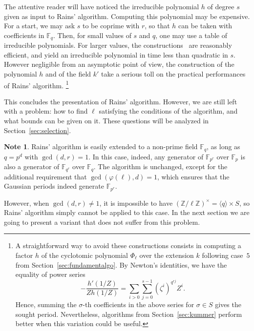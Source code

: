 \documentclass[12pt]{article}
\theoremstyle{plain}
\theoremstyle{definition}
\newtheorem{note}[theorem]{Note}
\def\Z{\ensuremath{\mathbb{Z}}}
\def\F{\ensuremath{\mathbb{F}}}
\def\euler{\ensuremath{\varphi}}
\newcounter{algorithm}
\begin{document}
The attentive reader will have noticed the irreducible polynomial $h$
of degree $s$ given as input to Rains' algorithm. Computing this
polynomial may be expensive. For a start, we may ask $s$ to be coprime
with $r$, so that $h$ can be taken with coefficients in $\F_q$. Then,
for small values of $s$ and $q$, one may use a table of irreducible
polynomials. For larger values, the
constructions~\cite{couveignes+lercier11,DeDoSc13,DeDoSc2014}
are reasonably efficient, and yield an irreducible polynomial in time
less than quadratic in $s$.
However negligible from an asymptotic point of view, the construction
of the polynomial $h$ and of the field $k'$ take a serious toll on the
practical performances of Rains' algorithm.%
\footnote{
A straightforward way to avoid these constructions consists in computing
a factor $h$ of the cyclotomic polynomial $\Phi_\ell$
over the extension $k$ following case~$5$ from Section~\ref{sec:fundamentalgo}.
By Newton's identities, we have the equality of power series
\begin{equation*}
  -\frac{h'(1/Z)}{Zh(1/Z)} = \sum_{i>0}\sum_{j=0}^{s-1}(\zeta^i)^{q^{rj}} Z^i.
\end{equation*}
Hence, summing the $\sigma$-th coefficients in the above series for
$\sigma\in S$ gives the sought period.
Nevertheless, algorithms from Section~\ref{sec:kummer} perform better when this variation
could be useful.
}

This concludes the presentation of Rains' algorithm. However, we are
still left with a problem: how to find $\ell$ satisfying the
conditions of the algorithm, and what bounds can be given on it. These
questions will be analyzed in Section~\ref{sec:selection}.

\begin{note}
  \label{note:rains-non-prime}
  Rains' algorithm is easily extended to a non-prime field $\F_q$, as
  long as $q=p^d$ with $\gcd(d,r)=1$. In this case, indeed, any
  generator of $\F_{p^r}$ over $\F_p$ is also a generator of
  $\F_{q^r}$ over $\F_q$. The algorithm is unchanged, except for the
  additional requirement that $\gcd(\euler(\ell),d)=1$, which ensures
  that the Gaussian periods indeed generate $\F_{p^r}$.

  However, when $\gcd(d,r)\ne 1$, it is impossible to have
  $(\Z/\ell\Z)^\times=\langle q\rangle\times S$, so Rains' algorithm
  simply cannot be applied to this case. In the next section we are
  going to present a variant that does not suffer from this problem.
\end{note}
\end{document}
